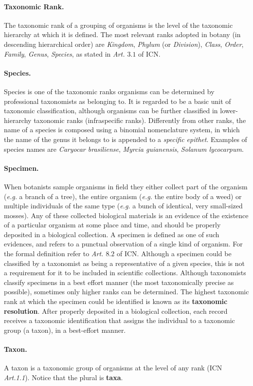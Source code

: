 \paragraph*{Taxonomic Rank.}
The taxonomic rank of a grouping of organisms is the level of the taxonomic hierarchy at which it is defined. The most relevant ranks adopted in botany (in descending hierarchical order) are \textit{Kingdom}, \textit{Phylum} (or \textit{Division}), \textit{Class}, \textit{Order}, \textit{Family}, \textit{Genus}, \textit{Species}, as stated in \textit{Art. $3.1$} of ICN.

\paragraph*{Species.}
Species is one of the taxonomic ranks organisms can be determined by professional taxonomists as belonging to. It is regarded to be a basic unit of taxonomic classification, although organisms can be further classified in lower-hierarchy taxonomic ranks (infraspecific ranks).
Differently from other ranks, the name of a species is composed using a binomial nomenclature system, in which the name of the genus it belongs to is appended to a \textit{specific epithet}.
Examples of species names are \textit{Caryocar brasiliense}, \textit{Myrcia guianensis}, \textit{Solanum lycocarpum}.

\paragraph*{Specimen.}
When botanists sample organisms in field they either collect part of the organism (\textit{e.g.} a branch of a tree), the entire organism (\textit{e.g.} the entire body of a weed) or multiple individuals of the same type (\textit{e.g.} a bunch of identical, very small-sized mosses). 
Any of these collected biological materials is an evidence of the existence of a particular organism at some place and time, and should be properly deposited in a biological collection. A specimen is defined as one of such evidences, and refers to a punctual observation of a single kind of organism. For the formal definition refer to \textit{Art. $8.2$} of ICN. 
Although a specimen could be classified by a taxonomist as being a representative of a given species, this is not a requirement for it to be included in scientific collections. Although taxonomists classify specimens in a best effort manner (the most taxonomically precise as possible), sometimes only higher ranks can be determined. The highest taxonomic rank at which the specimen could be identified is known as its \textbf{taxonomic resolution}.
After properly deposited in a biological collection, each record receives a taxonomic identification that assigns the individual to a taxonomic group (a taxon), in a best-effort manner.

\paragraph*{Taxon.}

A taxon is a taxonomic group of organisms at the level of any rank (ICN \textit{Art.1.1}). Notice that the plural is \textbf{taxa}.







\cite{Bhattacharya2007}
